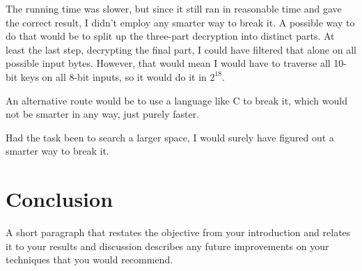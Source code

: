 \documentclass[a4paper,english,12pt]{article}
\begin{document}
The running time was slower, but since it still ran in reasonable time and gave
the correct result, I didn't employ any smarter way to break it. A possible way
to do that would be to split up the three-part decryption into distinct parts.
At least the last step, decrypting the final part, I could have filtered that
alone on all possible input bytes. However, that would mean I would have to
traverse all 10-bit keys on all 8-bit inputs, so it would do it in $2^{18}$.

An alternative route would be to use a language like C to break it, which would
not be smarter in any way, just purely faster.

Had the task been to search a larger space, I would surely have figured out a
smarter way to break it.

\section{Conclusion}

A short paragraph that restates the objective from your introduction and
relates it to your results and discussion describes any future improvements on
your techniques that you would recommend.



\end{document}
